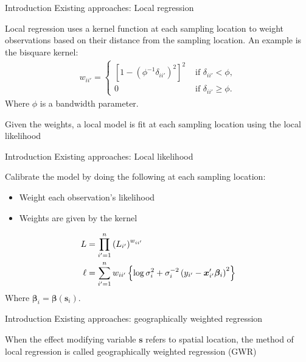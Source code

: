 \documentclass[12pt,t]{beamer}
\newcommand{\subt}[1]{{\footnotesize \color{subtitle} {#1}}}
\begin{document}
\begin{frame}{Introduction}
\subt{Existing approaches: Local regression}

\bigskip
Local regression uses a kernel function at each sampling location to weight observations based on their distance from the sampling location. An example is the bisquare kernel:
\begin{align}
	w_{ii'} = \begin{cases} \left[1-\left(\phi^{-1}\delta_{ii'}\right)^2\right]^2 &\mbox{ if } \delta_{ii'} < \phi, \\ 0 &\mbox{ if } \delta_{ii'} \geq \phi. \end{cases}
\end{align}
Where $\phi$ is a bandwidth parameter.

Given the weights, a local model is fit at each sampling location using the local likelihood \citep{Loader:1999}

\end{frame}






\begin{frame}{Introduction}
\subt{Existing approaches: Local likelihood}

\bigskip
Calibrate the model by doing the following at each sampling location:
\begin{itemize}
    \item Weight each observation's likelihood
    \item Weights are given by the kernel
\end{itemize}

\begin{align}
    L &= \prod_{i'=1}^n \left(L_{i'}\right)^{w_{ii'}} \notag \\
    \ell &= \sum_{i'=1}^n w_{ii'} \left\{\log \sigma_i^{2} + \sigma_i^{-2}\left(y_{i'} - \bm{x}_{i'}'\bm{\beta}_i\right)^2 \right\} \notag
\end{align}
Where $\bm{\beta}_i = \bm{\beta}(\bm{s}_i)$.

\end{frame}



\begin{frame}{Introduction}
\subt{Existing approaches: geographically weighted regression}

\bigskip
When the effect modifying variable $\bm{s}$ refers to spatial location, the method of local regression is called geographically weighted regression (GWR) \citep{Brundson:1998a, Fotheringham:2002}

\end{frame}
\end{document}
